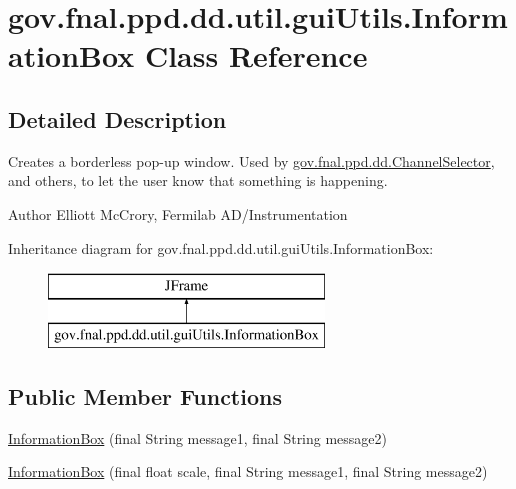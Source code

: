 \hypertarget{classgov_1_1fnal_1_1ppd_1_1dd_1_1util_1_1guiUtils_1_1InformationBox}{\section{gov.\-fnal.\-ppd.\-dd.\-util.\-gui\-Utils.\-Information\-Box Class Reference}
\label{classgov_1_1fnal_1_1ppd_1_1dd_1_1util_1_1guiUtils_1_1InformationBox}
}


\subsection{Detailed Description}
Creates a borderless pop-\/up window. Used by \hyperlink{classgov_1_1fnal_1_1ppd_1_1dd_1_1ChannelSelector}{gov.\-fnal.\-ppd.\-dd.\-Channel\-Selector}, and others, to let the user know that something is happening.

\begin{DoxyAuthor}{Author}
Elliott Mc\-Crory, Fermilab A\-D/\-Instrumentation 
\end{DoxyAuthor}
Inheritance diagram for gov.\-fnal.\-ppd.\-dd.\-util.\-gui\-Utils.\-Information\-Box\-:\begin{figure}[H]
\begin{center}
\leavevmode
\includegraphics[height=2.000000cm]{classgov_1_1fnal_1_1ppd_1_1dd_1_1util_1_1guiUtils_1_1InformationBox}
\end{center}
\end{figure}
\subsection*{Public Member Functions}
\begin{DoxyCompactItemize}
\item 
\hyperlink{classgov_1_1fnal_1_1ppd_1_1dd_1_1util_1_1guiUtils_1_1InformationBox_af2cfcbee5d202adf42d3fdebde0b6f8f}{Information\-Box} (final String message1, final String message2)
\item 
\hyperlink{classgov_1_1fnal_1_1ppd_1_1dd_1_1util_1_1guiUtils_1_1InformationBox_a8d529bff9a997e933cd317b74544ce3b}{Information\-Box} (final float scale, final String message1, final String message2)
\end{DoxyCompactItemize}



